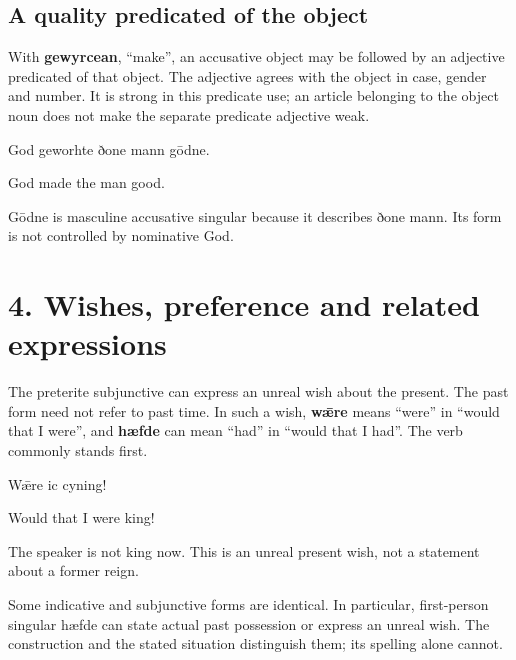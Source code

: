 \subsection*{A quality predicated of the object}

With \textbf{gewyrcean}, “make”, an accusative object may be followed by an adjective predicated of that object. The adjective agrees with the object in case, gender and number. It is strong in this predicate use; an article belonging to the object noun does not make the separate predicate adjective weak.

God geworhte ðone mann gōdne.

God made the man good.

Gōdne is masculine accusative singular because it describes ðone mann. Its form is not controlled by nominative God.

\section*{4. Wishes, preference and related expressions}

The preterite subjunctive can express an unreal wish about the present. The past form need not refer to past time. In such a wish, \textbf{wǣre} means “were” in “would that I were”, and \textbf{hæfde} can mean “had” in “would that I had”. The verb commonly stands first.

Wǣre ic cyning!

Would that I were king!

The speaker is not king now. This is an unreal present wish, not a statement about a former reign.

Some indicative and subjunctive forms are identical. In particular, first-person singular hæfde can state actual past possession or express an unreal wish. The construction and the stated situation distinguish them; its spelling alone cannot.

